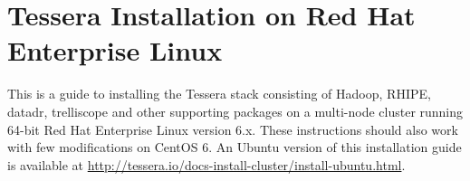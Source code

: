\section{Tessera Installation on Red Hat Enterprise Linux}

This is a guide to installing the Tessera stack consisting of
Hadoop, RHIPE, datadr, trelliscope and other
supporting packages on a multi-node cluster running 64-bit Red Hat
Enterprise Linux version 6.x.  These instructions should
also work with few modifications on CentOS 6.  An Ubuntu
version of this installation guide is available at
\url{http://tessera.io/docs-install-cluster/install-ubuntu.html}.
